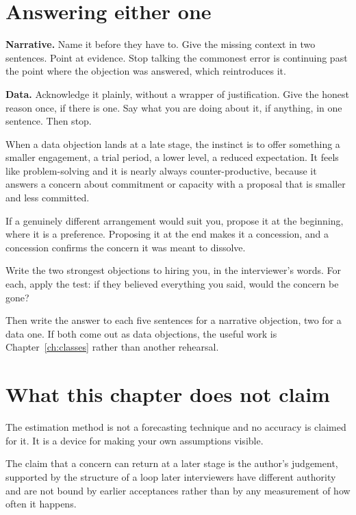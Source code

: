 \section{Answering either one}

\textbf{Narrative.} Name it before they have to. Give the missing context in
two sentences. Point at evidence. Stop talking \dash{} the commonest error is
continuing past the point where the objection was answered, which reintroduces
it.

\textbf{Data.} Acknowledge it plainly, without a wrapper of justification. Give
the honest reason once, if there is one. Say what you are doing about it, if
anything, in one sentence. Then stop.

\begin{kittrap}
When a data objection lands at a late stage, the instinct is to offer something
\dash{} a smaller engagement, a trial period, a lower level, a reduced
expectation. It feels like problem-solving and it is nearly always
counter-productive, because it answers a concern about commitment or capacity
with a proposal that is smaller and less committed.

If a genuinely different arrangement would suit you, propose it at the
beginning, where it is a preference. Proposing it at the end makes it a
concession, and a concession confirms the concern it was meant to dissolve.
\end{kittrap}

\begin{drill}
Write the two strongest objections to hiring you, in the interviewer's words.
For each, apply the test: if they believed everything you said, would the
concern be gone?

Then write the answer to each \dash{} five sentences for a narrative objection,
two for a data one. If both come out as data objections, the useful work is
Chapter~\ref{ch:classes} rather than another rehearsal.
\end{drill}

\section*{What this chapter does not claim}

The estimation method is not a forecasting technique and no accuracy is claimed
for it. It is a device for making your own assumptions visible.

The claim that a concern can return at a later stage is the author's judgement,
supported by the structure of a loop \dash{} later interviewers have different
authority and are not bound by earlier acceptances \dash{} rather than by any
measurement of how often it happens.
